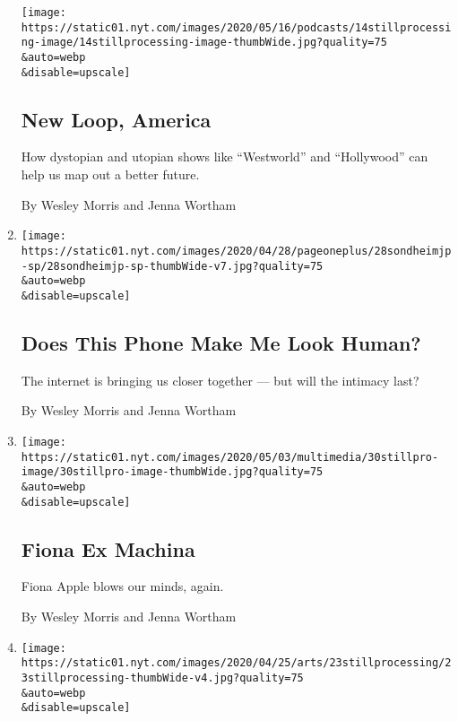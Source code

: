 \begin{enumerate}
  \texttt{[image: https://static01.nyt.com/images/2020/05/16/podcasts/14stillprocessing-image/14stillprocessing-image-thumbWide.jpg?quality=75\\\&auto=webp\\\&disable=upscale]}

  \hypertarget{new-loop-america}{%
  \subsection{New Loop, America}\label{new-loop-america}}

  How dystopian and utopian shows like ``Westworld'' and ``Hollywood''
  can help us map out a better future.

  By Wesley Morris and Jenna Wortham
\item
  \href{/2020/05/07/podcasts/still-processing-internet-vulnerability-sondheim-parks-recreation.html}{}

  \texttt{[image: https://static01.nyt.com/images/2020/04/28/pageoneplus/28sondheimjp-sp/28sondheimjp-sp-thumbWide-v7.jpg?quality=75\\\&auto=webp\\\&disable=upscale]}

  \hypertarget{does-this-phone-make-me-look-human}{%
  \subsection{Does This Phone Make Me Look
  Human?}\label{does-this-phone-make-me-look-human}}

  The internet is bringing us closer together --- but will the intimacy
  last?

  By Wesley Morris and Jenna Wortham
\item
  \href{/2020/04/30/podcasts/still-processing-fiona-apple-fetch-bolt-cutters.html}{}

  \texttt{[image: https://static01.nyt.com/images/2020/05/03/multimedia/30stillpro-image/30stillpro-image-thumbWide.jpg?quality=75\\\&auto=webp\\\&disable=upscale]}

  \hypertarget{fiona-ex-machina}{%
  \subsection{Fiona Ex Machina}\label{fiona-ex-machina}}

  Fiona Apple blows our minds, again.

  By Wesley Morris and Jenna Wortham
\item
  \href{/2020/04/23/podcasts/still-processing-halle-berry-sharon-stone-catwoman-quarantine.html}{}

  \texttt{[image: https://static01.nyt.com/images/2020/04/25/arts/23stillprocessing/23stillprocessing-thumbWide-v4.jpg?quality=75\\\&auto=webp\\\&disable=upscale]}


\end{enumerate}
